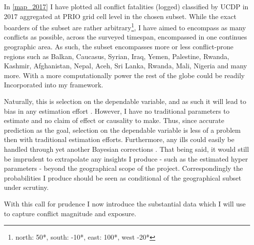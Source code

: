 \documentclass[a4paper]{article}
\begin{document}
In \autoref{map_2017} I have plotted all conflict fatalities (logged) classified by UCDP in 2017 aggregated at PRIO grid cell level in the chosen subset. While the exact boarders of the subset are rather arbitrary\footnote{north: 50*, south: -10*, east: 100*, west -20*}, I have aimed to encompass as many conflicts as possible, across the surveyed timespan, encompassed in one continues geographic area. As such, the subset encompasses more or less conflict-prone regions such as Balkan, Caucasus, Syrian, Iraq, Yemen, Palestine, Rwanda, Kashmir, Afghanistan, Nepal, Aceh, Sri Lanka, Rwanda, Mali, Nigeria and many more. With a more computationally power the rest of the globe could be readily Incorporated into my framework.\par

Naturally, this is selection on the dependable variable, and as such it will lead to bias in any estimation effort \citep[129-130]{king1994designing}. However, I have no traditional parameters to estimate and no claim of effect or causality to make. Thus, since accurate prediction as the goal, selection on the dependable variable is less of a problem then with traditional estimation efforts. Furthermore, any ills could easily be handled through yet another Bayesian corrections \citep[627-628]{King_Zeng_2001}. That being said, it would still be imprudent to extrapolate any insights I produce - such as the estimated hyper parameters - beyond the geographical scope of the project. Correspondingly the probabilities I produce should be seen as conditional of the geographical subset under scrutiny.\par



With this call for prudence I now introduce the substantial data which I will use to capture conflict magnitude and exposure.\par
\end{document}
